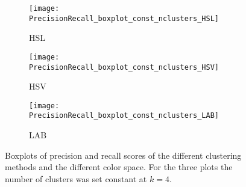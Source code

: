 \begin{figure}[!ht]
    \centering
    \begin{subfigure}[b]{0.3\textwidth}
        \texttt{[image: PrecisionRecall\_boxplot\_const\_nclusters\_HSL]}
        \caption{HSL}
    \end{subfigure}     
    \begin{subfigure}[b]{0.3\textwidth}
    	\centering
    	\texttt{[image: PrecisionRecall\_boxplot\_const\_nclusters\_HSV]}
        \caption{HSV}
    \end{subfigure}     
    \begin{subfigure}[b]{0.3\textwidth}
    	\centering
        \texttt{[image: PrecisionRecall\_boxplot\_const\_nclusters\_LAB]}
        \caption{LAB}
    \end{subfigure} 
        	    
    \caption{Boxplots of precision and recall scores of the different clustering methods and the different color space. For the three plots the number of clusters was set constant at $k=4$.}\label{fig:PR_boxplot_scores}    
\end{figure}



